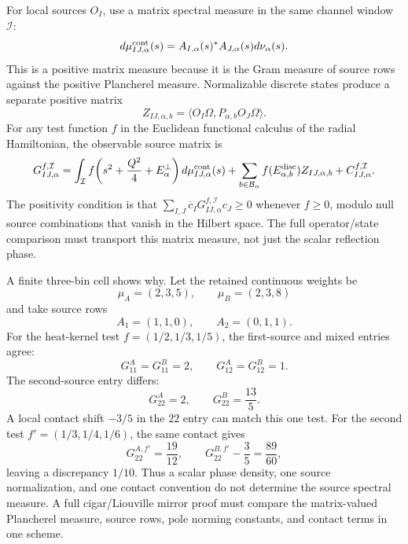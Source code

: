 \begin{construction}
\label{constr:cigar-liouville-matrix-spectral-measure}
For local sources \(O_I\), use a matrix spectral measure in the same
channel window \({\mathcal I}\):
\begin{equation}
  d\mu^{\rm cont}_{I J,\alpha}(s)
  =
  A_{I,\alpha}(s)^*A_{J,\alpha}(s)
  d\nu_{\alpha}(s).
  \label{eq:cigar-liouville-matrix-spectral-measure}
\end{equation}
This is a positive matrix measure because it is the Gram measure of source
rows against the positive Plancherel measure.  Normalizable discrete states
produce a separate positive matrix
\[
  Z_{I J,\alpha,b}
  =
  \langle O_I\Omega,P_{\alpha,b}O_J\Omega\rangle .
\]
For any test function \(f\) in the Euclidean functional calculus of the radial
Hamiltonian, the observable source matrix is
\begin{equation}
  G^{f,{\mathcal I}}_{I J,\alpha}
  =
  \int_{\mathcal I} f\!\left(s^2+\frac{Q^2}{4}+E_\alpha^\perp\right)
    d\mu^{\rm cont}_{I J,\alpha}(s)
  +\sum_{b\in{\mathcal B}_\alpha}
    f(E_{\alpha,b}^{\rm disc})Z_{I J,\alpha,b}
  +C^{f,{\mathcal I}}_{I J,\alpha}.
  \label{eq:cigar-liouville-matrix-spectral-kernel}
\end{equation}
The positivity condition is that
\(\sum_{I,J}\overline c_I G^{f,{\mathcal I}}_{I J,\alpha}c_J\ge0\) whenever
\(f\ge0\), modulo null source combinations that vanish in the Hilbert space.
The full operator/state comparison must transport this matrix measure, not
just the scalar reflection phase.

A finite three-bin cell shows why.  Let the retained continuous weights be
\[
  \mu_A=(2,3,5),\qquad \mu_B=(2,3,8)
\]
and take source rows
\[
  A_1=(1,1,0),\qquad A_2=(0,1,1).
\]
For the heat-kernel test \(f=(1/2,1/3,1/5)\), the first-source and mixed
entries agree:
\[
  G^A_{11}=G^B_{11}=2,\qquad G^A_{12}=G^B_{12}=1.
\]
The second-source entry differs:
\[
  G^A_{22}=2,\qquad G^B_{22}=\frac{13}{5}.
\]
A local contact shift \(-3/5\) in the \(22\) entry can match this one test.
For the second test \(f'=(1/3,1/4,1/6)\), the same contact gives
\[
  G^{A,f'}_{22}=\frac{19}{12},\qquad
  G^{B,f'}_{22}-\frac35=\frac{89}{60},
\]
leaving a discrepancy \(1/10\).  Thus a scalar phase density, one source
normalization, and one contact convention do not determine the source
spectral measure.  A full cigar/Liouville mirror proof must compare the
matrix-valued Plancherel measure, source rows, pole norming constants, and
contact terms in one scheme.
\end{construction}

